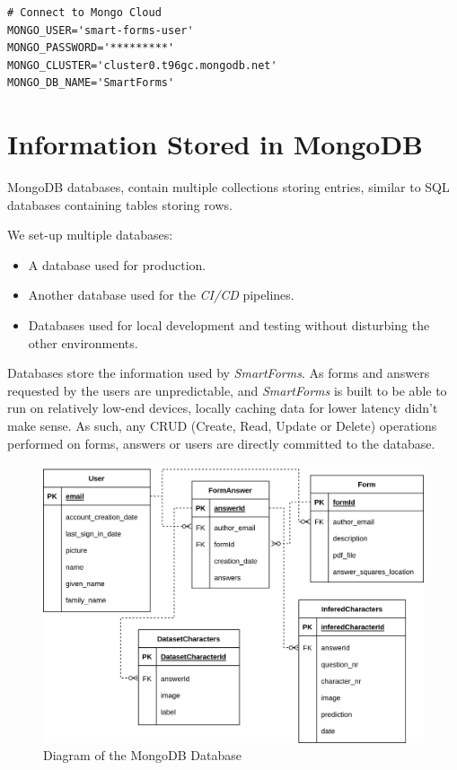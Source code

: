 \documentclass[12pt, a4paper]{report}
\begin{document}
\begin{verbatim}
# Connect to Mongo Cloud
MONGO_USER='smart-forms-user'
MONGO_PASSWORD='*********'
MONGO_CLUSTER='cluster0.t96gc.mongodb.net'
MONGO_DB_NAME='SmartForms'
\end{verbatim}

\section{Information Stored in MongoDB}

MongoDB databases, contain multiple collections storing entries, similar to SQL databases containing tables storing rows.

We set-up multiple databases:
\begin{itemize}
    \item A database used for production.
    \item Another database used for the \textit{CI/CD} pipelines.
    \item Databases used for local development and testing without disturbing the other environments. 
\end{itemize}

Databases store the information used by \textit{SmartForms}. As forms and answers requested by the users are unpredictable, and \textit{SmartForms} is built to be able to run on relatively low-end devices, locally caching data for lower latency didn't make sense. As such, any CRUD (Create, Read, Update or Delete) operations performed on forms, answers or users are directly committed to the database.


\begin{figure}[!h]
    \centering
    \includegraphics[width=35em]{images/diagrams/ER_diagram.png}
    \caption{Diagram of the MongoDB Database}
    \label{fig:label}
\end{figure}
\end{document}
